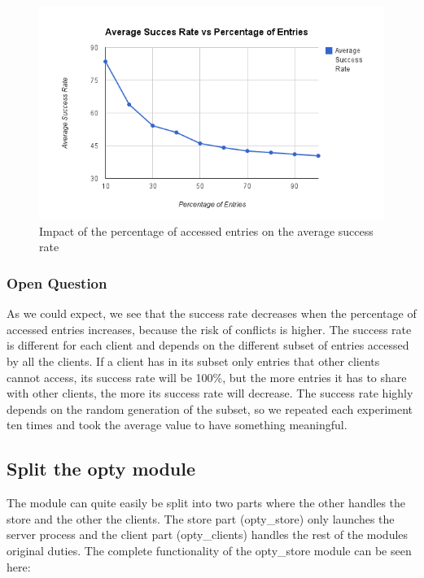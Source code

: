 \documentclass[a4paper, 11pt]{article}
\begin{document}
\begin{figure}[H]
\begin{center}
\includegraphics[scale=0.5]{exp5.png}
\caption{Impact of the percentage of accessed entries on the average success rate}
\end{center}
\end{figure}

\subsubsection{Open Question}
As we could expect, we see that the success rate decreases when the percentage of accessed entries increases, because the risk of conflicts is higher. The success rate is different for each client and depends on the different subset of entries accessed by all the clients. If a client has in its subset only entries that other clients cannot access, its success rate will be 100\%, but the more entries it has to share with other clients, the more its success rate will decrease. The success rate highly depends on the random generation of the subset, so we repeated each experiment ten times and took the average value to have something meaningful.

\subsection{Split the opty module}
The module can quite easily be split into two parts where the other handles the store and the other the clients. The store part (opty\_store) only launches the server process and the client part (opty\_clients) handles the rest of the modules original duties. The complete functionality of the opty\_store module can be seen here:
\end{document}
